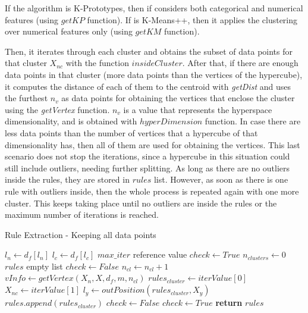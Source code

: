 If the algorithm is K-Prototypes, then if considers both categorical and numerical features (using $getKP$ function). If is K-Means++, then it applies the clustering over numerical features only (using $getKM$ function).

Then, it iterates through each cluster and obtains the subset of data points for that cluster $X_{nc}$ with the function $insideCluster$. After that, if there are enough data points in that cluster (more data points than the vertices of the hypercube), it computes the distance of each of them to the centroid with \textit{getDist} and uses the furthest $n_v$ as data points for obtaining the vertices that enclose the cluster using the \textit{getVertex} function. $n_v$ is a value that represents the hyperspace dimensionality, and is obtained with $hyperDimension$ function.
In case there are less data points than the number of vertices that a hypercube of that dimensionality has, then all of them are used for obtaining the vertices. This last scenario does not stop the iterations, since a hypercube in this situation could still include outliers, needing further splitting. As long as there are no outliers inside the rules, they are stored in $rules$ list. However, as soon as there is one rule with outliers inside, then the whole process is repeated again with one more cluster. This keeps taking place until no outliers are inside the rules or the maximum number of iterations is reached.

\begin{algorithm}[]
\caption{Rule Extraction - Keeping all data points}\label{alg:annex-oneclass-keep}
\begin{algorithmic}[1]
    \State $ l_n \gets d_{f}[l_n]$
    \State $ l_c \gets d_{f}[l_c]$
    \State $max\_iter$ reference value
    \State $check \gets True$
    \State $n_{clusters} \gets 0$
        \State $rules$ empty list
            \State $check \gets False$
        \Else
            \State $n_{cl} \gets n_{cl} + 1$
            \State $vInfo \gets getVertex(X_n, X, d_f, m, n_{cl})$
                \State $rules_{cluster} \gets iterValue[0]$
                \State $X_{nc} \gets iterValue[1]$
                \State $l_{y} \gets outPosition(rules_{cluster}, X_y)$
                    \State $rules.append(rules_{cluster})$
                    \State $check \gets False$
                \Else
                    \State $check \gets True$
                \EndIf\label{check_anomalies_positions1}
            \EndFor\label{itercluster1}
        \EndIf\label{}
    \EndWhile\label{}
    \State \textbf{return} $rules$
\EndProcedure
\end{algorithmic}
\end{algorithm}

